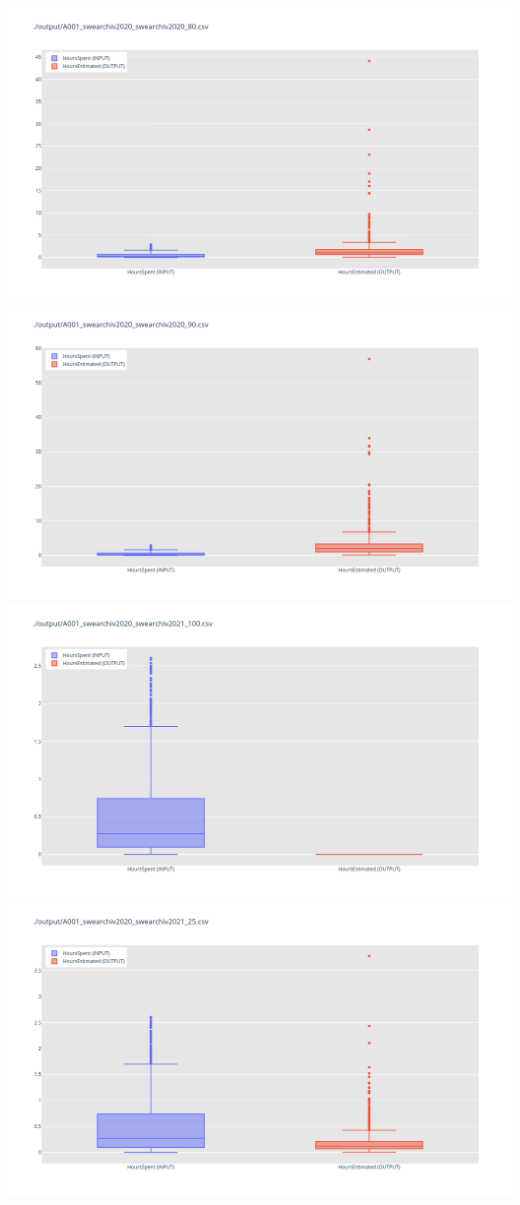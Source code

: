 \includegraphics[width=\textwidth]{Scripts/output/A001_swearchiv2020_swearchiv2020_80.csv.png}
\includegraphics[width=\textwidth]{Scripts/output/A001_swearchiv2020_swearchiv2020_90.csv.png}
\includegraphics[width=\textwidth]{Scripts/output/A001_swearchiv2020_swearchiv2021_100.csv.png}
\includegraphics[width=\textwidth]{Scripts/output/A001_swearchiv2020_swearchiv2021_25.csv.png}

